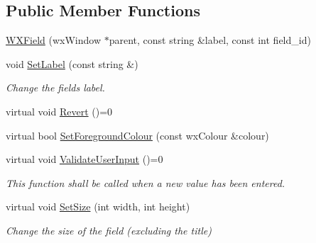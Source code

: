 \subsection*{Public Member Functions}
\begin{DoxyCompactItemize}
\item 
\mbox{\hyperlink{class_obj_cryst_1_1_w_x_field_a750b0a756fd49172806fd5af020a1e07}{W\+X\+Field}} (wx\+Window $\ast$parent, const string \&label, const int field\+\_\+id)
\item 
\mbox{\label{class_obj_cryst_1_1_w_x_field_a0092c7a134e627a4c9b975c339f6d54e}} 
void \mbox{\hyperlink{class_obj_cryst_1_1_w_x_field_a0092c7a134e627a4c9b975c339f6d54e}{Set\+Label}} (const string \&)
\begin{DoxyCompactList}\small\item\em Change the field\textquotesingle{}s label. \end{DoxyCompactList}\item 
virtual void \mbox{\hyperlink{class_obj_cryst_1_1_w_x_field_a178d6d770d1e3adfa02e27da94b2dffa}{Revert}} ()=0
\item 
virtual bool \mbox{\hyperlink{class_obj_cryst_1_1_w_x_field_a66cd13618de16d95beeb21e293678c87}{Set\+Foreground\+Colour}} (const wx\+Colour \&colour)
\item 
\mbox{\label{class_obj_cryst_1_1_w_x_field_aa0a7701e04c91832e8fda19b5b2c147a}} 
virtual void \mbox{\hyperlink{class_obj_cryst_1_1_w_x_field_aa0a7701e04c91832e8fda19b5b2c147a}{Validate\+User\+Input}} ()=0
\begin{DoxyCompactList}\small\item\em This function shall be called when a new value has been entered. \end{DoxyCompactList}\item 
\mbox{\label{class_obj_cryst_1_1_w_x_field_a98e5e9791b6fb89a699e68499540d5d6}} 
virtual void \mbox{\hyperlink{class_obj_cryst_1_1_w_x_field_a98e5e9791b6fb89a699e68499540d5d6}{Set\+Size}} (int width, int height)
\begin{DoxyCompactList}\small\item\em Change the size of the field (excluding the title) \end{DoxyCompactList}\end{DoxyCompactItemize}
